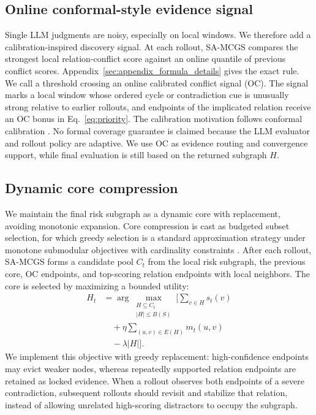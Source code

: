 \documentclass[11pt]{article}
\newcommand{\samcgs}{SA-MCGS}
\newcommand{\oc}{OC}
\begin{document}
\subsection{Online conformal-style evidence signal}

Single LLM judgments are noisy, especially on local windows.  We therefore add a calibration-inspired discovery signal.  At each rollout, \samcgs{} compares the strongest local relation-conflict score against an online quantile of previous conflict scores. Appendix~\ref{sec:appendix_formula_details} gives the exact rule.  We call a threshold crossing an online calibrated conflict signal (\oc{}). The signal marks a local window whose ordered cycle or contradiction cue is unusually strong relative to earlier rollouts, and endpoints of the implicated relation receive an \oc{} bonus in Eq.~\ref{eq:priority}.  The calibration motivation follows conformal calibration \citep{vovk2005algorithmic,gibbs2021adaptive}. No formal coverage guarantee is claimed because the LLM evaluator and rollout policy are adaptive.  We use \oc{} as evidence routing and convergence support, while final evaluation is still based on the returned subgraph $H$.

\subsection{Dynamic core compression}
\label{sec:dynamic-core}

We maintain the final risk subgraph as a dynamic core with replacement, avoiding monotonic expansion.  Core compression is cast as budgeted subset selection, for which greedy selection is a standard approximation strategy under monotone submodular objectives with cardinality constraints \citep{nemhauser1978analysis}.  After each rollout, \samcgs{} forms a candidate pool $C_t$ from the local risk subgraph, the previous core, \oc{} endpoints, and top-scoring relation endpoints with local neighbors.  The core is selected by maximizing a bounded utility:
\begin{equation}
    \begin{aligned}
    H_t &= \arg\max_{\substack{H\subseteq C_t\\ |H|\leq B(S)}}
    \Bigg[
    \sum_{v\in H}s_t(v)\\
    &\quad + \eta \sum_{(u,v)\in E(H)}m_t(u,v)\\
    &\quad - \lambda |H|
    \Bigg].
    \end{aligned}
    \label{eq:core}
\end{equation}
We implement this objective with greedy replacement: high-confidence endpoints may evict weaker nodes, whereas repeatedly supported relation endpoints are retained as locked evidence.   When a rollout observes both endpoints of a severe contradiction, subsequent rollouts should revisit and stabilize that relation, instead of allowing unrelated high-scoring distractors to occupy the subgraph. 
\end{document}
